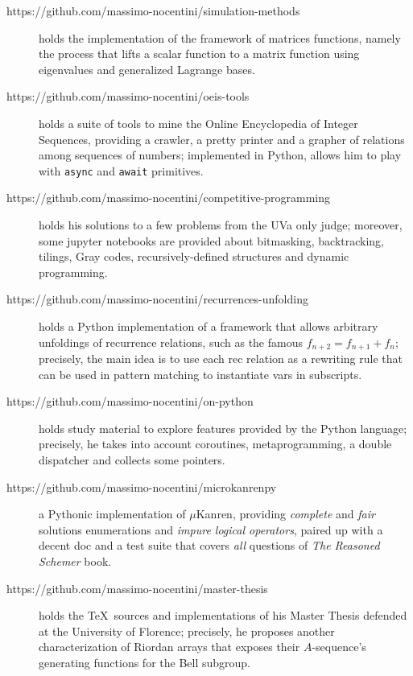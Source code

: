 \documentclass[a4paper]{article} %
\begin{document}
\begin{description}
        \item[https://github.com/massimo-nocentini/simulation-methods] holds
        the implementation of the framework of matrices functions, namely the
        process that lifts a scalar function to a matrix function using
        eigenvalues and generalized Lagrange bases.

        \item[https://github.com/massimo-nocentini/oeis-tools] holds a suite of tools
        to mine the Online Encyclopedia of Integer Sequences, providing a crawler,
        a pretty printer and a grapher of relations among sequences of numbers; implemented
        in Python, allows him to play with \verb|async| and \verb|await| primitives.

        \item[https://github.com/massimo-nocentini/competitive-programming]
        holds his solutions to a few problems from the UVa only judge;
        moreover, some jupyter notebooks are provided about bitmasking,
        backtracking, tilings, Gray codes, recursively-defined structures and
        dynamic programming.

        \item[https://github.com/massimo-nocentini/recurrences-unfolding] holds
        a Python implementation of a framework that allows arbitrary unfoldings
        of recurrence relations, such as the famous $f_{n+2}=f_{n+1}+f_{n}$;
        precisely, the main idea is to use each rec relation as a rewriting
        rule that can be used in pattern matching to instantiate vars in
        subscripts. 

        \item[https://github.com/massimo-nocentini/on-python] holds study
        material to explore features provided by the Python language;
        precisely, he takes into account coroutines, metaprogramming, a double
        dispatcher and collects some pointers.

        \item[https://github.com/massimo-nocentini/microkanrenpy] a Pythonic
        implementation of $\mu$Kanren, providing \textit{complete} and
        \textit{fair} solutions enumerations and \textit{impure logical
        operators}, paired up with a decent doc and a test suite that covers
        \textit{all} questions of \textit{The Reasoned Schemer} book.

        \item[https://github.com/massimo-nocentini/master-thesis] holds the
        \TeX\, sources and implementations of his Master Thesis defended at the
        University of Florence; precisely, he proposes another characterization
        of Riordan arrays that exposes their $A$-sequence's generating
        functions for the Bell subgroup.


\end{description}
\end{document}
